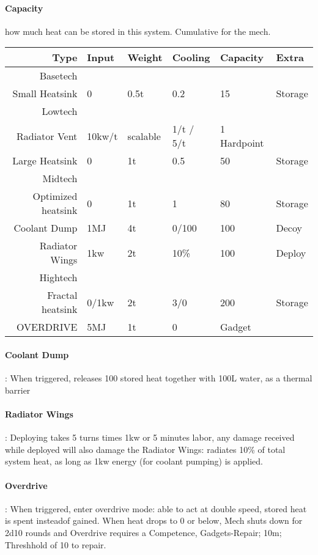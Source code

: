 \paragraph{Capacity} how much heat can be stored in this system.
Cumulative for the mech.

\begin{tabular}{r|lllll}
    Type & Input & Weight & Cooling & Capacity &Extra\\
    \hline Basetech\\
    Small Heatsink & 0 & 0.5t & 0.2 & 15 & Storage\\
    \hline Lowtech\\
    Radiator Vent & 10kw/t &scalable & 1/t / 5/t & 1 Hardpoint\\
    Large Heatsink & 0 & 1t & 0.5 & 50 &Storage\\
    \hline Midtech\\
    Optimized heatsink  & 0 & 1t & 1 & 80 &Storage\\
    Coolant Dump  & 1MJ & 4t & 0/100 & 100 &Decoy\\
    Radiator Wings & 1kw & 2t & 10\% & 100 & Deploy\\
    \hline Hightech\\
    Fractal heatsink & 0/1kw & 2t & 3/0 & 200 & Storage\\
    OVERDRIVE & 5MJ & 1t & 0 & Gadget\\
\end{tabular}\par

\paragraph{Coolant Dump}: When triggered, releases 100 stored heat together with 100L water, as a thermal barrier
\paragraph{Radiator Wings}: Deploying takes 5 turns times 1kw or 5 minutes labor, any damage received while deployed
will also damage the Radiator Wings: radiates 10\% of total system heat, as long as 1kw  energy (for coolant pumping)
is applied.
\paragraph{Overdrive}: When triggered, enter overdrive mode: able to act at double speed,
stored heat is spent insteadof gained.
When heat drops to 0 or below, Mech shuts down for 2d10 rounds and Overdrive requires a Competence, Gadgets-Repair;
10m;
Threshhold of 10 to repair.


